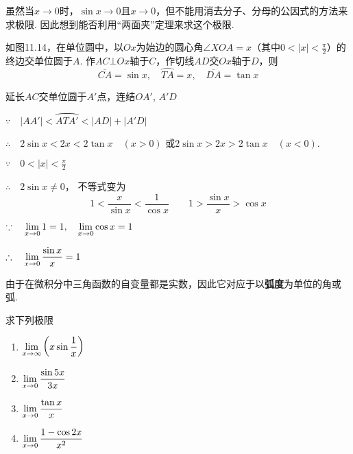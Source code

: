 \noindent
\begin{minipage}{.55\textwidth}
    \CTEXindent
虽然当$x\to 0$时，$\sin x\to 0$且$x\to 0$，但不能用消去分子、分母的公因式的方法来求极限. 因此想到能否利用“两面夹”定理来求这个极限.

如图11.14，在单位圆中，以$Ox$为始边的圆心角$\angle XOA=x$（其中$0<|x|<\frac{\pi}{2}$）的终边交单位圆于$A$. 作$AC\bot Ox$轴于$C$，作切线$AD$交$Ox$轴于$D$，则
\[\overline{CA}=\sin x,\quad \wideparen{TA}=x,\quad \overline{DA}=\tan x\]
\end{minipage}\hfill
\begin{minipage}{.45\textwidth}
  \centering
{}  
\end{minipage}

延长$AC$交单位圆于$A'$点，连结$OA'$, $A'D$

$\because\quad |AA'|<\wideparen{ATA'}<|AD|+|A'D|$

$\therefore\quad 2\sin x<2x<2\tan x\quad (x>0)$
或$2\sin x>2x>2\tan x\quad (x<0)$.

$\because\quad 0<|x|<\frac{\pi}{2}$

$\therefore\quad 2\sin x\ne 0$，
不等式变为
\[
    1<\frac{x}{\sin x}<\frac{1}{\cos x}\qquad  1>\frac{\sin x}{x}>\cos x
\]

$\because\quad \lim\limits_{x\to 0}1=1,\quad \lim\limits_{x\to 0}\cos x=1$

$\therefore\quad \lim\limits_{x\to 0}\dfrac{\sin x}{x}=1$

\begin{rmk}
由于在微积分中三角函数的自变量都是实数，因此它对应于以\textbf{弧度}为单位的角或弧.
\end{rmk}

\begin{example}
求下列极限
\begin{multicols}{2}
\begin{enumerate}[(1)]
    \item $\lim\limits_{x\to \infty}\left(x\sin\dfrac{1}{x}\right)$
    \item $\lim\limits_{x\to 0}\dfrac{\sin 5x}{3x}$
    \item $\lim\limits_{x\to 0}\dfrac{\tan x}{x}$
    \item $\lim\limits_{x\to 0}\dfrac{1-\cos 2x}{x^2}$
\end{enumerate}
\end{multicols}
\end{example}

